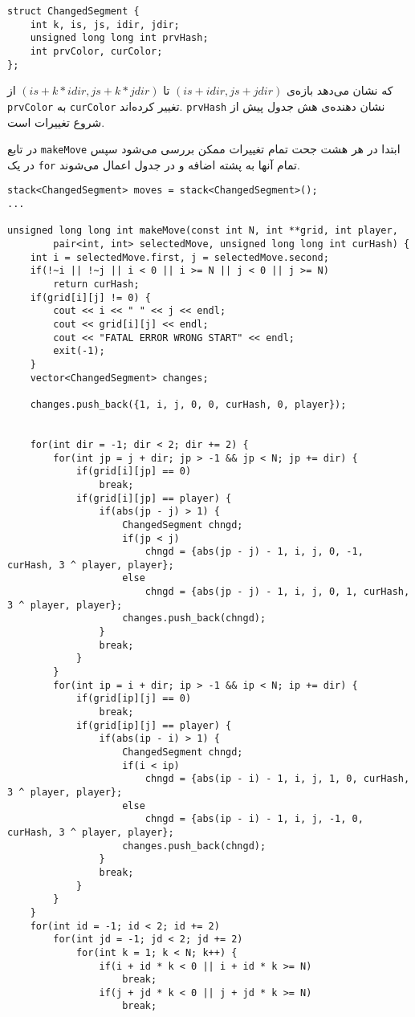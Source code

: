 \begin{latin}
\begin{lstlisting}
struct ChangedSegment {
	int k, is, js, idir, jdir;
	unsigned long long int prvHash;
	int prvColor, curColor;
};
\end{lstlisting}
\end{latin}

که نشان می‌دهد بازه‌ی
$(is + idir, js + jdir)$
تا
$(is + k * idir, js + k * jdir)$
از
\verb;prvColor;
به
\verb;curColor;
تغییر کرده‌اند.
\verb;prvHash;
نشان دهنده‌ی هش جدول پیش از شروع تغییرات است.

در تابع 
\verb;makeMove;
ابتدا در هر هشت جحت تمام تغییرات ممکن بررسی می‌شود سپس در یک 
\verb;for;
تمام آنها به پشته اضافه و در جدول اعمال می‌شوند.

\begin{latin}
\begin{lstlisting}
stack<ChangedSegment> moves = stack<ChangedSegment>();
...

unsigned long long int makeMove(const int N, int **grid, int player, 
		pair<int, int> selectedMove, unsigned long long int curHash) {
	int i = selectedMove.first, j = selectedMove.second;
	if(!~i || !~j || i < 0 || i >= N || j < 0 || j >= N)
		return curHash;
	if(grid[i][j] != 0) {
		cout << i << " " << j << endl;
		cout << grid[i][j] << endl;
		cout << "FATAL ERROR WRONG START" << endl;
		exit(-1);
	}
	vector<ChangedSegment> changes;

	changes.push_back({1, i, j, 0, 0, curHash, 0, player});


	for(int dir = -1; dir < 2; dir += 2) {
		for(int jp = j + dir; jp > -1 && jp < N; jp += dir) {
			if(grid[i][jp] == 0) 
				break;
			if(grid[i][jp] == player) {
				if(abs(jp - j) > 1) {
					ChangedSegment chngd;
					if(jp < j) 
						chngd = {abs(jp - j) - 1, i, j, 0, -1, curHash, 3 ^ player, player};
					else
						chngd = {abs(jp - j) - 1, i, j, 0, 1, curHash, 3 ^ player, player};
					changes.push_back(chngd);
				}
				break;
			}
		}
		for(int ip = i + dir; ip > -1 && ip < N; ip += dir) {
			if(grid[ip][j] == 0) 
				break;
			if(grid[ip][j] == player) {
				if(abs(ip - i) > 1) {
					ChangedSegment chngd;
					if(i < ip)
						chngd = {abs(ip - i) - 1, i, j, 1, 0, curHash, 3 ^ player, player};
					else
						chngd = {abs(ip - i) - 1, i, j, -1, 0, curHash, 3 ^ player, player};
					changes.push_back(chngd);
				}
				break;
			}
		}
	}
	for(int id = -1; id < 2; id += 2) 
		for(int jd = -1; jd < 2; jd += 2) 
			for(int k = 1; k < N; k++) {
				if(i + id * k < 0 || i + id * k >= N)
					break;
				if(j + jd * k < 0 || j + jd * k >= N)
					break;


\end{lstlisting}
\end{latin}
